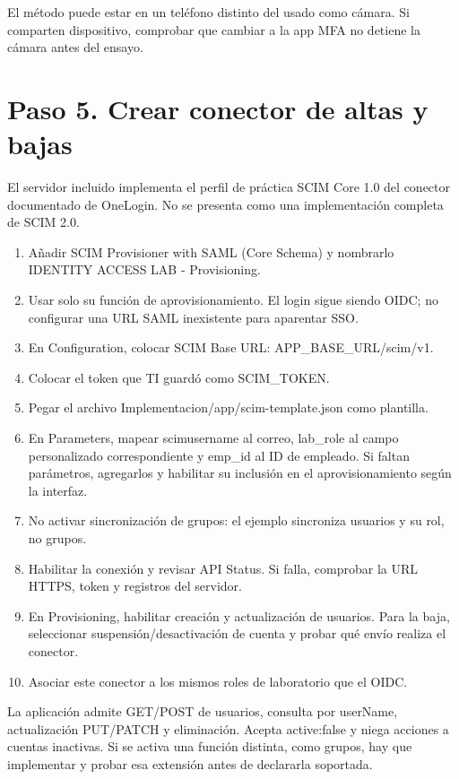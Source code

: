 \documentclass[12pt,a4paper]{article}
\begin{document}
El método puede estar en un teléfono distinto del usado como cámara. Si comparten dispositivo, comprobar que cambiar a la app MFA no detiene la cámara antes del ensayo.\par
{}\section*{Paso 5. Crear conector de altas y bajas}
El servidor incluido implementa el perfil de práctica SCIM Core 1.0 del conector documentado de OneLogin. No se presenta como una implementación completa de SCIM 2.0.\par
\begin{enumerate}
\item Añadir \textnormal{SCIM Provisioner with SAML (Core Schema)} y nombrarlo \textnormal{IDENTITY ACCESS LAB - Provisioning}.
\item Usar solo su función de aprovisionamiento. El login sigue siendo OIDC; no configurar una URL SAML inexistente para aparentar SSO.
\item En Configuration, colocar SCIM Base URL: \textnormal{APP\_\allowbreak{}BASE\_\allowbreak{}URL/\allowbreak{}scim/\allowbreak{}v1}.
\item Colocar el token que TI guardó como SCIM\_TOKEN.
\item Pegar el archivo \textnormal{Implementacion/\allowbreak{}app/\allowbreak{}scim-template.json} como plantilla.
\item En Parameters, mapear \textnormal{scimusername} al correo, \textnormal{lab\_\allowbreak{}role} al campo personalizado correspondiente y \textnormal{emp\_\allowbreak{}id} al ID de empleado. Si faltan parámetros, agregarlos y habilitar su inclusión en el aprovisionamiento según la interfaz.
\item No activar sincronización de grupos: el ejemplo sincroniza usuarios y su rol, no grupos.
\item Habilitar la conexión y revisar API Status. Si falla, comprobar la URL HTTPS, token y registros del servidor.
\item En Provisioning, habilitar creación y actualización de usuarios. Para la baja, seleccionar suspensión/desactivación de cuenta y probar qué envío realiza el conector.
\item Asociar este conector a los mismos roles de laboratorio que el OIDC.
\end{enumerate}
La aplicación admite GET/POST de usuarios, consulta por \textnormal{userName}, actualización PUT/PATCH y eliminación. Acepta \textnormal{active:false} y niega acciones a cuentas inactivas. Si se activa una función distinta, como grupos, hay que implementar y probar esa extensión antes de declararla soportada.\par
\end{document}
